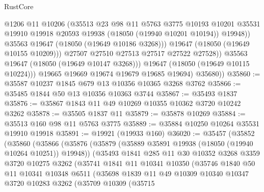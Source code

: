 \begin{lexlean}{RustCore}
\begin{coremodule}
                        @1206
                        @11
                        @10206
                        (@35513
                          @23
                          @98
                          @11
                          @5763
                          @3775
                          @10193
                          @10201
                          @35531
                          @19910
                          @19918
                          @20593
                          @19938
                          (@18050 (@19940 @10201 @10194))
                          @19948))
                      @35563
                      @19647
                      (@18050 (@19649 @10186 @3268)))
                    @19647
                    (@18050 (@19649 @10155 @10209)))
                  @27507
                  @27510
                  @27513
                  @27517
                  @27522
                  @27528))
              @35563
              @19647
              (@18050 (@19649 @10147 @3268)))
            @19647
            (@18050 (@19649 @10115 @10224)))
          @19665
          @19669
          @19674
          @19679
          @19685
          @19694)
        @35680))
@35860 := @35587 @10237 @1845 @679 @13 @10356 @10365 @3268 @3762
@35866 := @35485 @1844 @50 @13 @10356 @10363 @3744
@35867 := @35493 @1837
@35876 := @35867 @1843 @11 @49 @10269 @10355 @10362 @3720 @10242 @3262
@35878 := @35505 @1837 @11
@35879 := @35878 @10269
@35884 := @35513 @160 @98 @11 @5763 @3775
@35889 := @35884 @10250 @10264 @35531 @19910 @19918
@35891 := @19921 (@19933 @160)
@36020 := @35457
    (@35852
      (@35860
        (@35866
          (@35876
            (@35879 (@35889 @35891 @19938 (@18050 (@19940 @10264 @10251)) @19948))
            (@35493
              @1841
              @285
              @11
              @30
              @10352
              @3268
              @3359
              @3720
              @10275
              @3262
              (@35741
                @1841
                @11
                @10341
                @10350
                (@35746
                  @1840
                  @50
                  @11
                  @10341
                  @10348
                  @6511
                  (@35698
                    @1839
                    @11
                    @49
                    @10309
                    @10340
                    @10347
                    @3720
                    @10283
                    @3262
                    (@35709
                      @10309
                      (@35715

\end{coremodule}
\end{lexlean}
